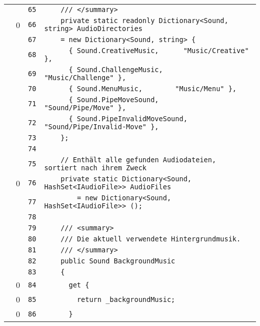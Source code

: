 \documentclass[a4paper,10pt]{article}
\begin{document}
\begin{longtable}[l]{lrrl}
\cellcolor{gray} &  & \verb~65~ & \verb~    /// </summary>~\\
\cellcolor{red} & 0 & \verb~66~ & \verb~    private static readonly Dictionary<Sound, string> AudioDirectories~\\
\cellcolor{gray} &  & \verb~67~ & \verb~    = new Dictionary<Sound, string> {~\\
\cellcolor{gray} &  & \verb~68~ & \verb~      { Sound.CreativeMusic,      "Music/Creative" },~\\
\cellcolor{gray} &  & \verb~69~ & \verb~      { Sound.ChallengeMusic,      "Music/Challenge" },~\\
\cellcolor{gray} &  & \verb~70~ & \verb~      { Sound.MenuMusic,        "Music/Menu" },~\\
\cellcolor{gray} &  & \verb~71~ & \verb~      { Sound.PipeMoveSound,      "Sound/Pipe/Move" },~\\
\cellcolor{gray} &  & \verb~72~ & \verb~      { Sound.PipeInvalidMoveSound,  "Sound/Pipe/Invalid-Move" },~\\
\cellcolor{gray} &  & \verb~73~ & \verb~    };~\\
\cellcolor{gray} &  & \verb~74~ & \verb~~\\
\cellcolor{gray} &  & \verb~75~ & \verb~    // Enthält alle gefunden Audiodateien, sortiert nach ihrem Zweck~\\
\cellcolor{red} & 0 & \verb~76~ & \verb~    private static Dictionary<Sound, HashSet<IAudioFile>> AudioFiles~\\
\cellcolor{gray} &  & \verb~77~ & \verb~        = new Dictionary<Sound, HashSet<IAudioFile>> ();~\\
\cellcolor{gray} &  & \verb~78~ & \verb~~\\
\cellcolor{gray} &  & \verb~79~ & \verb~    /// <summary>~\\
\cellcolor{gray} &  & \verb~80~ & \verb~    /// Die aktuell verwendete Hintergrundmusik.~\\
\cellcolor{gray} &  & \verb~81~ & \verb~    /// </summary>~\\
\cellcolor{gray} &  & \verb~82~ & \verb~    public Sound BackgroundMusic~\\
\cellcolor{gray} &  & \verb~83~ & \verb~    {~\\
\cellcolor{red} & 0 & \verb~84~ & \verb~      get {~\\
\cellcolor{red} & 0 & \verb~85~ & \verb~        return _backgroundMusic;~\\
\cellcolor{red} & 0 & \verb~86~ & \verb~      }~\\

\end{longtable}
\end{document}
